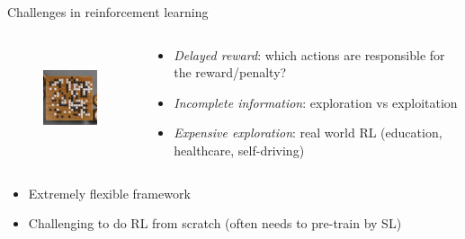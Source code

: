 \documentclass[usenames,dvipsnames,11pt,aspectratio=169]{beamer}
\begin{document}
\begin{frame}
    {Challenges in reinforcement learning}
    \begin{columns}
        \begin{column}{.4\textwidth}
    \begin{figure}
        \includegraphics[height=3cm]{figures/go}
    \end{figure}
        \end{column}
        \begin{column}{.6\textwidth}
    \begin{itemize}
        \item \emph{Delayed reward}: which actions are responsible for the reward/penalty?
        \item \emph{Incomplete information}: exploration vs exploitation
        \item \emph{Expensive exploration}: real world RL (education, healthcare, self-driving)
    \end{itemize}
        \end{column}
    \end{columns}
    \bigskip
    \begin{itemize}
        \item Extremely flexible framework
        \item Challenging to do RL from scratch (often needs to pre-train by SL)
    \end{itemize}
\end{frame}
\end{document}
